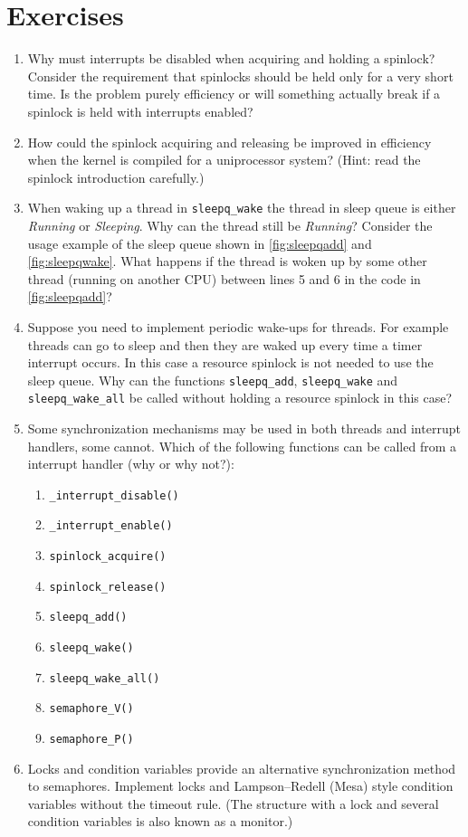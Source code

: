 \documentclass[twoside,a4paper]{report}
\newenvironment{exercises}[1][\addcontentsline{toc}{section}{Exercises}%
\section*{Exercises}\markright{EXERCISES}]{%
#1%
\begin{enumerate}%
}{%
\end{enumerate}
}
\newcounter{exercisec}[chapter]
\newcommand{\exercise}[1]{%
\item[\stepcounter{exercisec}\arabic{chapter}.\theexercisec{}.] #1%
}
\newcommand{\cexercise}[1]{%
\item[\stepcounter{exercisec}{\huge\Keyboard}\hspace{5mm}\textbf{\arabic{chapter}.\theexercisec{}.}] #1%
}
\begin{document}
\begin{exercises}

\exercise{Why must interrupts be disabled when acquiring and holding a
spinlock? Consider the requirement that spinlocks should be held only
for a very short time. Is the problem purely efficiency or will
something actually break if a spinlock is held with interrupts enabled?}

\exercise{How could the spinlock acquiring and releasing be improved
in efficiency when the kernel is compiled for a uniprocessor system?
(Hint: read the spinlock introduction carefully.)}

\exercise{When waking up a thread in \texttt{sleepq\_wake} the thread
  in sleep queue is either \emph{Running} or \emph{Sleeping}. Why can
  the thread still be \emph{Running}? Consider the usage example of
  the sleep queue shown in \autoref{fig:sleepqadd} and
  \autoref{fig:sleepqwake}. What happens if the thread is woken up by
  some other thread (running on another CPU) between lines 5 and 6 in
  the code in \autoref{fig:sleepqadd}?}

\exercise{Suppose you need to implement periodic wake-ups for threads.
For example threads can go to sleep and then they are waked up every
time a timer interrupt occurs. In this case a resource spinlock is not
needed to use the sleep queue. Why can the functions
\texttt{sleepq\_add}, \texttt{sleepq\_wake} and
\texttt{sleepq\_wake\_all} be called without holding a resource
spinlock in this case?}

\exercise{Some synchronization mechanisms may be used in both threads
and interrupt handlers, some cannot. Which of the following functions
can be called from a interrupt handler (why or why not?):
\begin{enumerate}
\item \texttt{\_interrupt\_disable()}
\item \texttt{\_interrupt\_enable()}
\item \texttt{spinlock\_acquire()}
\item \texttt{spinlock\_release()}
\item \texttt{sleepq\_add()}
\item \texttt{sleepq\_wake()}
\item \texttt{sleepq\_wake\_all()}
\item \texttt{semaphore\_V()}
\item \texttt{semaphore\_P()}
\end{enumerate}}

\cexercise{Locks and condition variables provide an alternative
synchronization method to semaphores. Implement locks and
Lampson--Redell (Mesa) style condition variables without the timeout
rule. (The structure with a lock and several condition variables is
also known as a monitor.)

}
\end{exercises}
\end{document}
